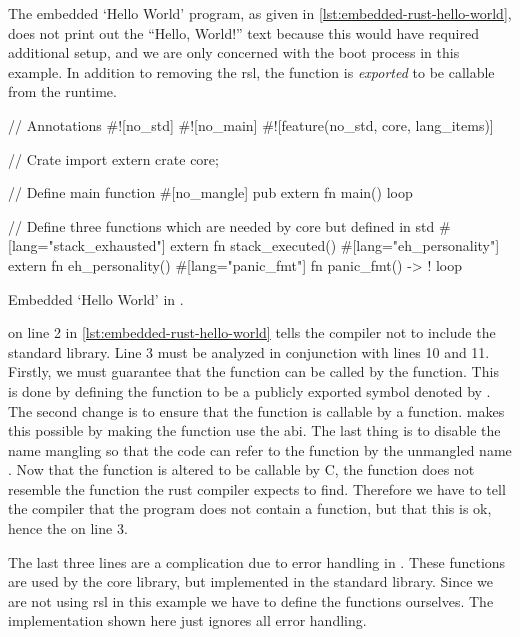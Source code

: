 The embedded `Hello World' program, as given in \autoref{lst:embedded-rust-hello-world}, does not print out the ``Hello, World!'' text because this would have required additional setup, and we are only concerned with the boot process in this example.
In addition to removing the \gls{rsl}, the {\main} function is \emph{exported} to be callable from the {\C} runtime.

\begin{listing}[H]
  \begin{rustcode}
// Annotations
#![no_std]
#![no_main]
#![feature(no_std, core, lang_items)]

// Crate import
extern crate core;

// Define main function
#[no_mangle]
pub extern fn main() {
  loop {}
}

// Define three functions which are needed by core but defined in std
#[lang="stack_exhausted"] extern fn stack_executed() {}
#[lang="eh_personality"] extern fn eh_personality() {}
#[lang="panic_fmt"] fn panic_fmt() -> ! { loop {} }
\end{rustcode}
\caption{Embedded `Hello World' in {\rust}.}
\label{lst:embedded-rust-hello-world}
\end{listing}

\attrib{\#\![no\_std]} on line 2 in \autoref{lst:embedded-rust-hello-world} tells the {\rust} compiler not to include the standard library.
Line 3 must be analyzed in conjunction with lines 10 and 11.
Firstly, we must guarantee that the function can be called by the  function.
This is done by defining the {\main} function to be a publicly exported symbol denoted by .
The second change is to ensure that the function is callable by a {\C} function.
 makes this possible by making the function use the {\C} \gls{abi}.
The last thing is to disable the {\rust} name mangling so that the {\C} code can refer to the function by the unmangled name {\main}.
Now that the {\main} function is altered to be callable by C, the function does not resemble the function the rust compiler expects to find.
Therefore we have to tell the compiler that the program does not contain a {\main} function, but that this is ok, hence the \attrib{\#\![no\_main]} on line 3.

The last three lines are a complication due to error handling in {\rust}.
These functions are used by the core library, but implemented in the standard library.
Since we are not using \gls{rsl} in this example we have to define the functions ourselves.
The implementation shown here just ignores all error handling.

